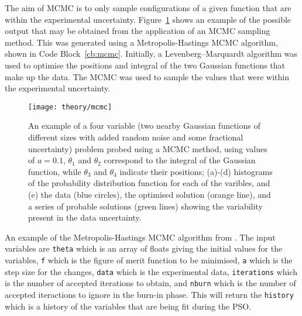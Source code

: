 The aim of MCMC is to only sample configurations of a given function that are within the experimental uncertainty.
Figure~\ref{fig:mcmc} shows an example of the possible output that may be obtained from the application of an MCMC sampling method.
This was generated using a Metropolis-Hastings MCMC algorithm,\autocite{metropolis_equation_1953,hastings_monte_1970} shown in Code Block~\ref{cb:mcmc}.
Initially, a Levenberg–Marquardt algorithm\autocite{levenberg_method_1944,marquardt_algorithm_1963} was used to optimise the positions and integral of the two Gaussian functions that make up the data.
The MCMC was used to sample the values that were within the experimental uncertainty.
%
\begin{figure}[t]
    \centering
    \texttt{[image: theory/mcmc]}
    \caption{An example of a four variable (two nearby Gaussian functions of different sizes with added random noise and some fractional uncertainty) problem probed using a MCMC method, using values of $a=0.1$, $\theta_1$ and $\theta_2$ correspond to the integral of the Gaussian function, while $\theta_3$ and $\theta_4$ indicate their positions; (a)-(d) histograms of the probability distribution function for each of the varibles, and (e) the data (blue circles), the optimised solution (orange line), and a series of probable solutions (green lines) showing the variability present in the data uncertainty.}
    \label{fig:mcmc}
\end{figure}
%
\begin{listing}[b]
    \forceversofloat
    \centering
    \caption{An example of the Metropolis-Hastings MCMC algorithm from \cite{metropolis_equation_1953,hastings_monte_1970}. The input variables are \texttt{theta} which is an array of floats giving the initial values for the variables, \texttt{f} which is the figure of merit function to be minimised, \texttt{a} which is the step size for the changes, \texttt{data} which is the experimental data, \texttt{iterations} which is the number of accepted iterations to obtain, and \texttt{nburn} which is the number of accepted iteractions to ignore in the burn-in phase. This will return the \texttt{history} which is a history of the variables that are being fit during the PSO.}
    
    \label{cb:mcmc}
\end{listing}
%

